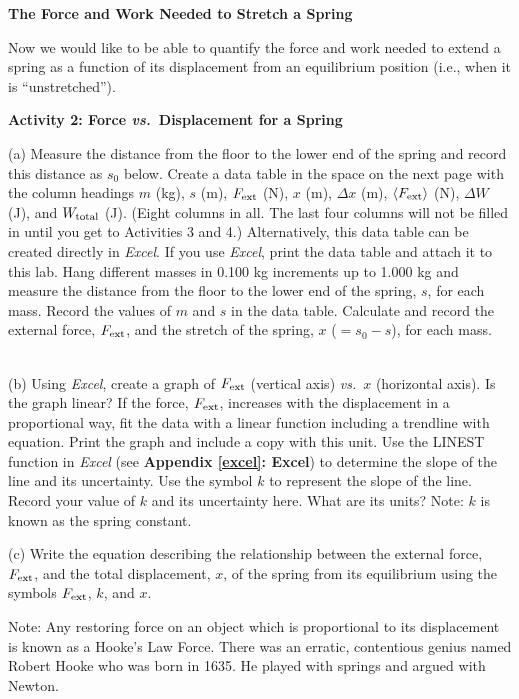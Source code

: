 \textbf{The Force and Work Needed to Stretch a Spring} 

Now we would like to be able to quantify the force and work needed to extend
a spring as a function of its displacement from an equilibrium position (i.e.,
when it is ``unstretched'').

\textbf{Activity 2: Force \textit{vs.}~Displacement for a Spring }

(a) Measure the distance from the floor to the lower end of the spring and record this distance as \( s_{0} \) below. Create a data table in the space on the
next page with the column headings $m$ (kg), $s$ (m), \( F_{\rm ext} \) (N), 
$x$ (m), \( \Delta  x\)
(m), \( \langle F_{\rm ext}\rangle \) (N), \( \Delta  W\) (J), and \( W_{\rm total} \) (J). (Eight columns in all. 
The last four columns will not be filled in until you get to Activities 3 and 4.) 
Alternatively, this data table can be created directly in \textit{Excel}. 
If you use \textit{Excel}, print the data table and attach it to this lab.
Hang different masses in 0.100 kg increments up to 1.000 kg and measure the distance from the floor to the lower end of the spring, $s$, for each mass. 
Record the values of $m$ and $s$ in the data table. 
Calculate and record the external force, \( F_{\rm ext} \), and the stretch of the spring, \(x\) (\(= s_{0} - s\)), for each mass.
\newpage
{\ \ \ }
 \answerspace{60mm}

(b) Using \textit{Excel}, create a graph of \( F_{\rm ext} \) (vertical axis) \textit{vs.}~$x$ (horizontal axis). Is the graph linear?
If the force, \( F_{\rm ext} \), increases with the displacement in a proportional
way, fit the data with a linear function including a trendline with equation. 
Print the graph and include a copy with this unit. Use the LINEST function 
in \textit{Excel} (see \textbf{Appendix \ref{excel}: Excel}) to determine the slope of the 
line and its uncertainty. Use the symbol $k$ to represent the slope of the line.
Record your value of $k$ and its uncertainty here. What are its units? 
Note:  $k$ is known as the spring constant.
\answerspace{15mm}

(c) Write the equation describing the relationship between the external force,
\( F_{\rm ext} \), and the total displacement, 
$x$, of the spring from its equilibrium
using the symbols \( F_{\rm ext} \), $k$, and $x$.
\answerspace{15mm}

Note: Any restoring force on an object which is proportional to its displacement
is known as a Hooke's Law Force. There was an erratic, contentious genius named
Robert Hooke who was born in 1635. He played with springs and argued with 
Newton.

